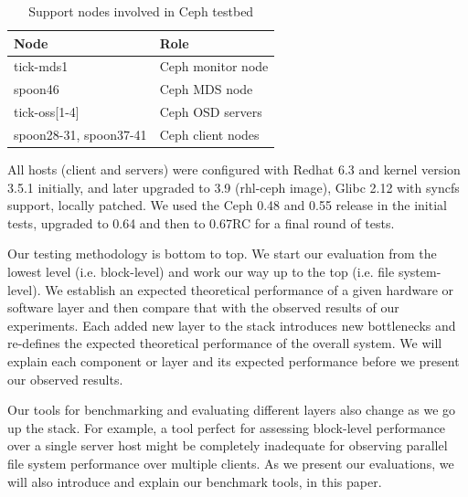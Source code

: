 \begin{table}[!t]
\centering
\caption{Support nodes involved in Ceph testbed}
\label{tbl:ceph-test-nodes}
    \begin{tabular}{ll}
    \hline
    Node & Role \\
    \hline
    tick-mds1 & Ceph monitor node \\
    spoon46 & Ceph MDS node \\
    tick-oss[1-4] & Ceph OSD servers \\
    spoon28-31, spoon37-41 & Ceph client nodes \\
    \hline
    \end{tabular}
\end{table}

All hosts  (client and servers) were configured with Redhat 6.3 and kernel
version 3.5.1 initially, and later upgraded to 3.9 (rhl-ceph image), Glibc
2.12 with syncfs support, locally patched.  We used the Ceph 0.48 and 0.55
release in the initial tests, upgraded to 0.64 and then to 0.67RC for a final
round of tests.




Our testing methodology is bottom to top. We start our evaluation from the
lowest level (i.e. block-level) and work our way up to the top (i.e. file
system-level). We establish an expected theoretical performance of a given
hardware or software layer and then compare that with the observed results of
our experiments. Each added new layer to the stack introduces new bottlenecks
and re-defines the expected theoretical performance of the overall system. We
will explain each component or layer and its expected performance before we
present our observed results.

Our tools for benchmarking and evaluating different layers also change as we go
up the stack.  For example, a tool perfect for assessing block-level
performance over a single server host might be completely inadequate for
observing parallel file system performance over multiple clients. As we present
our evaluations, we will also introduce and explain our benchmark tools, in
this paper.
